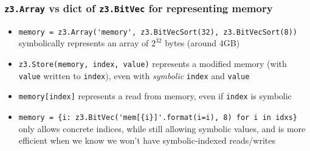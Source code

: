\documentclass[aspectratio=169]{beamer}
\begin{document}
\begin{frame}[fragile]
\frametitle{\texttt{z3.Array} vs dict of \texttt{z3.BitVec} for representing memory}
\begin{itemize}
\item \verb|memory = z3.Array('memory', z3.BitVecSort(32), z3.BitVecSort(8))| symbolically represents an array of $2^{32}$ bytes (around 4GB)
\item \verb|z3.Store(memory, index, value)| represents a modified memory (with \verb|value| written to \verb|index|), even with \textit{symbolic} \verb|index| and \verb|value|
\item \verb|memory[index]| represents a read from memory, even if \verb|index| is symbolic
\item \verb|memory = {i: z3.BitVec('mem[{i}]'.format(i=i), 8) for i in idxs}| only allows concrete indices, while still allowing symbolic values, and is more efficient when we know we won't have symbolic-indexed reads/writes
\end{itemize}
\end{frame}
\end{document}
